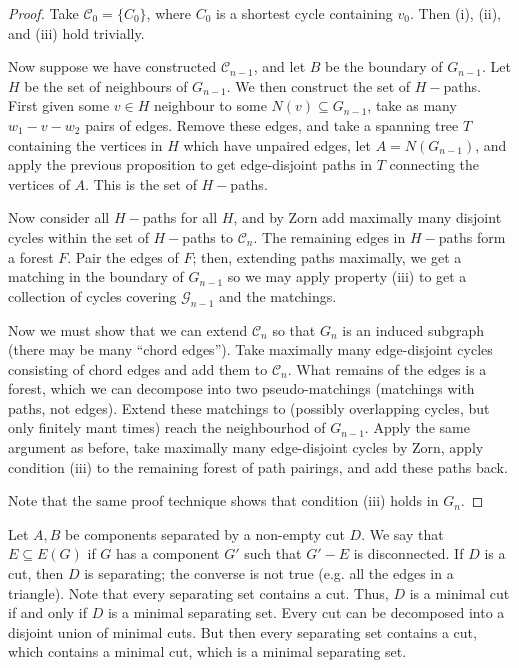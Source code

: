 \documentclass[11pt, a4paper]{memoir}
\theoremstyle{change}
\theoremstyle{plain}
\theoremstyle{nonumberplain}
\newtheorem{proof}{Proof}
\numberwithin{equation}{section}
\begin{document}
\begin{proof}
    Take $\mathcal{C}_0=\{C_0\}$, where $C_0$ is a shortest cycle containing $v_0$.
    Then (i), (ii), and (iii) hold trivially.

    Now suppose we have constructed $\mathcal{C}_{n-1}$, and let $B$ be the boundary of $G_{n-1}$.
    Let $H$ be the set of neighbours of $G_{n-1}$.
    We then construct the set of $H-$paths.
    First given some $v\in H$ neighbour to some $N(v)\subseteq G_{n-1}$, take as many $w_1-v-w_2$ pairs of edges.
    Remove these edges, and take a spanning tree $T$ containing the vertices in $H$ which have unpaired edges, let $A=N(G_{n-1})$, and apply the previous proposition to get edge-disjoint paths in $T$ connecting the vertices of $A$.
    This is the set of $H-$paths.

    Now consider all $H-$paths for all $H$, and by Zorn add maximally many disjoint cycles within the set of $H-$paths to $\mathcal{C}_n$.
    The remaining edges in $H-$paths form a forest $F$.
    Pair the edges of $F$; then, extending paths maximally, we get a matching in the boundary of $G_{n-1}$ so we may apply property (iii) to get a collection of cycles covering $\mathcal{G}_{n-1}$ and the matchings.

    Now we must show that we can extend $\mathcal{C}_n$ so that $G_n$ is an induced subgraph (there may be many ``chord edges'').
    Take maximally many edge-disjoint cycles consisting of chord edges and add them to $\mathcal{C}_n$.
    What remains of the edges is a forest, which we can decompose into two pseudo-matchings (matchings with paths, not edges).
    Extend these matchings to (possibly overlapping cycles, but only finitely mant times) reach the neighbourhod of $G_{n-1}$.
    Apply the same argument as before, take maximally many edge-disjoint cycles by Zorn, apply condition (iii) to the remaining forest of path pairings, and add these paths back.

    Note that the same proof technique shows that condition (iii) holds in $G_n$.
\end{proof}
Let $A,B$ be components separated by a non-empty cut $D$.
We say that $E\subseteq E(G)$ if $G$ has a component $G'$ such that $G'-E$ is disconnected.
If $D$ is a cut, then $D$ is separating; the converse is not true (e.g. all the edges in a triangle).
Note that every separating set contains a cut.
Thus, $D$ is a minimal cut if and only if $D$ is a minimal separating set.
Every cut can be decomposed into a disjoint union of minimal cuts.
But then every separating set contains a cut, which contains a minimal cut, which is a minimal separating set.
\end{document}
